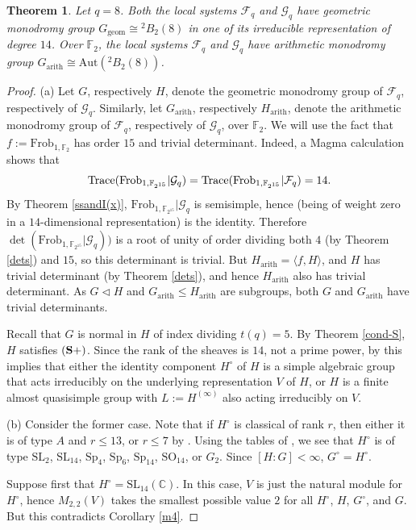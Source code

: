 \documentclass[11pt]{amsart}
\theoremstyle{plain}
\newtheorem{thm}{Theorem}
\theoremstyle{definition}
\numberwithin{thm}{section}
\numberwithin{equation}{thm}
\newcommand{\Trace}{{\rm Trace}}
\newcommand{\Aut}{\mathrm{Aut}}
\newcommand{\SL}{\mathrm{SL}}
\newcommand{\Sp}{\mathrm{Sp}}
\newcommand{\SO}{\mathrm{SO}}
\newcommand{\sF}{{\mathcal F}}
\newcommand{\sG}{{\mathcal G}}
\newcommand{\C}{{\mathbb C}}
\newcommand{\F}{{\mathbb F}}
\newcommand{\0}{\emptyset}
\newcommand{\ari}{{\mathrm {arith}}}
\newcommand{\geo}{{\mathrm {geom}}}
\newcommand{\CSP}{\mathrm {({\bf S+})}}
\newcommand{\tw}[1]{{}^#1\!}
\newcommand{\Frob}{\mathrm{Frob}}
\begin{document}
\begin{thm}\label{main1}
Let $q=8$. Both the local systems $\sF_q$ and $\sG_q$ have geometric monodromy group $G_\geo \cong \tw2 B_2(8)$ in
one of its irreducible representation of degree $14$. Over $\F_2$, the local systems $\sF_q$ and $\sG_q$ have arithmetic monodromy group $G_\ari \cong \Aut(\tw2 B_2(8))$.
\end{thm}

\begin{proof}
(a) Let $G$, respectively $H$, denote the geometric monodromy group of $\sF_q$, respectively of $\sG_q$. 
Similarly, let $G_{\ari}$, respectively $H_{\ari}$, denote the arithmetic monodromy group of $\sF_q$, respectively of $\sG_q$, over $\F_2$.
We will use the fact that $f:=\Frob_{1,\F_2}$ has order $15$ and trivial determinant. Indeed, a {\sc Magma} calculation shows that
$$\Trace(\Frob_{1,\F_{2^{15}}}|\sG_q)=\Trace(\Frob_{1,\F_{2^{15}}}|\sF_q)=14.$$
By Theorem \ref{ssandI(x)}, $\Frob_{1,\F_{2^{15}}}|\sG_q$ is semisimple, hence (being of weight zero in a $14$-dimensional representation) is the identity. Therefore $\det(\Frob_{1,\F_{2^{15}}}|\sG_q))$ is a root of unity of order dividing both $4$ (by Theorem \ref{dets}) and $15$, so this determinant is  trivial. But $H_{\ari} = \langle f,H \rangle$, and $H$ has trivial determinant (by Theorem \ref{dets}), and hence 
 $H_{\ari}$ also has trivial determinant. As $G \lhd H$ and $G_{\ari} \leq H_{\ari} $ are subgroups, both $G$ and $G_{\ari}$ have trivial determinants.
 
Recall that $G$ is normal in $H$ of index dividing $t(q)=5$.
By Theorem \ref{cond-S}, 
$H$ satisfies $\CSP$. Since the rank of the sheaves is $14$, not a prime power, by \cite[Lemma 1.1]{KT5} this implies that 
either the identity component $H^\circ$ of $H$ is a simple algebraic group that acts irreducibly on the underlying representation $V$ of
$H$, or $H$ is a finite almost quasisimple group with $L:=H^{(\infty)}$ also acting irreducibly on $V$.

\smallskip
(b) Consider the former case. Note that if $H^\circ$ is classical of rank $r$, then either it is of type $A$ and $r \leq 13$, or 
$r \leq 7$ by \cite[Proposition 5.4.11]{KlL}. Using the tables of \cite{Lu}, we see that $H^\circ$ is of type $\SL_2$, $\SL_{14}$, $\Sp_4$, $\Sp_6$, $\Sp_{14}$, 
$\SO_{14}$, or $G_2$. Since $[H:G] < \infty$, $G^\circ=H^\circ$.

Suppose first that $H^\circ = \SL_{14}(\C)$. In this case, $V$ is just the natural module for $H^\circ$, hence $M_{2,2}(V)$ takes the 
smallest possible value $2$ for all $H^\circ$, $H$, $G^\circ$, and $G$. But this contradicts Corollary \ref{m4}.


\end{proof}
\end{document}
